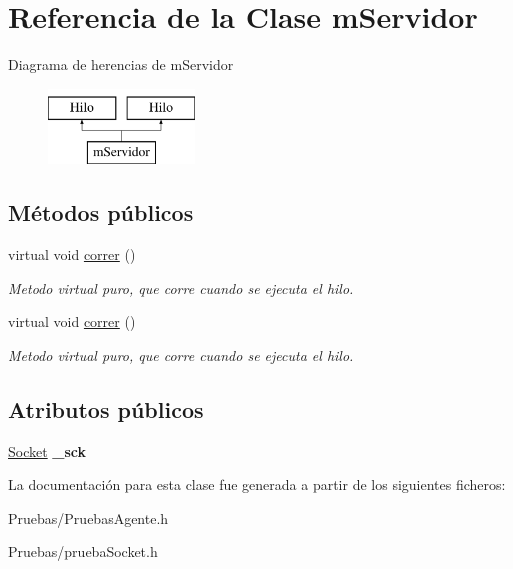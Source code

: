 \hypertarget{classmServidor}{\section{\-Referencia de la \-Clase m\-Servidor}
\label{classmServidor}
}
\-Diagrama de herencias de m\-Servidor\begin{figure}[H]
\begin{center}
\leavevmode
\includegraphics[height=2.000000cm]{classmServidor}
\end{center}
\end{figure}
\subsection*{\-Métodos públicos}
\begin{DoxyCompactItemize}
\item 
\hypertarget{classmServidor_a67e6c4e358e277a9638e304f4a5f412d}{virtual void \hyperlink{classmServidor_a67e6c4e358e277a9638e304f4a5f412d}{correr} ()}\label{classmServidor_a67e6c4e358e277a9638e304f4a5f412d}

\begin{DoxyCompactList}\small\item\em \-Metodo virtual puro, que corre cuando se ejecuta el hilo. \end{DoxyCompactList}\item 
\hypertarget{classmServidor_a67e6c4e358e277a9638e304f4a5f412d}{virtual void \hyperlink{classmServidor_a67e6c4e358e277a9638e304f4a5f412d}{correr} ()}\label{classmServidor_a67e6c4e358e277a9638e304f4a5f412d}

\begin{DoxyCompactList}\small\item\em \-Metodo virtual puro, que corre cuando se ejecuta el hilo. \end{DoxyCompactList}\end{DoxyCompactItemize}
\subsection*{\-Atributos públicos}
\begin{DoxyCompactItemize}
\item 
\hypertarget{classmServidor_a06cc1937fe9183585903babbf7d8580f}{\hyperlink{classSocket}{\-Socket} {\bfseries \-\_\-sck}}\label{classmServidor_a06cc1937fe9183585903babbf7d8580f}

\end{DoxyCompactItemize}


\-La documentación para esta clase fue generada a partir de los siguientes ficheros\-:\begin{DoxyCompactItemize}
\item 
\-Pruebas/\-Pruebas\-Agente.\-h\item 
\-Pruebas/prueba\-Socket.\-h\end{DoxyCompactItemize}
